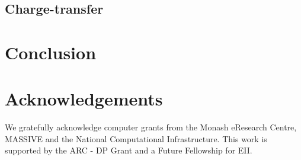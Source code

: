 \documentclass[journal = jctcce]{achemso}
\begin{document}
\subsection{Charge-transfer}

%
%
%



\section{Conclusion}


\section*{Acknowledgements}
We gratefully acknowledge computer grants from the Monash eResearch
Centre, MASSIVE and the National Computational Infrastructure. This
work is supported by the ARC - DP Grant and a Future Fellowship for EII.


\renewcommand{\bibfont}{\footnotesize}
\printbibliography


\begin{appendices}



\end{appendices}
\end{document}
